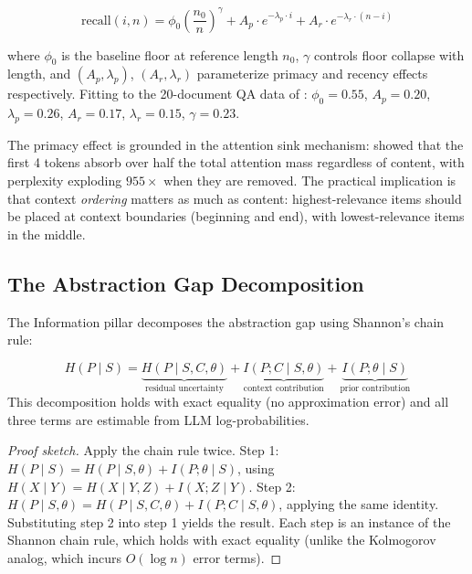 \begin{equation}
    \text{recall}(i, n) = \phi_0 \left(\frac{n_0}{n}\right)^{\!\gamma} + A_p \cdot e^{-\lambda_p \cdot i} + A_r \cdot e^{-\lambda_r \cdot (n - i)}
\end{equation}

where $\phi_0$ is the baseline floor at reference length $n_0$, $\gamma$ controls floor collapse with length, and $(A_p, \lambda_p)$, $(A_r, \lambda_r)$ parameterize primacy and recency effects respectively. Fitting to the 20-document QA data of \citet{liu2024lost}: $\phi_0 = 0.55$, $A_p = 0.20$, $\lambda_p = 0.26$, $A_r = 0.17$, $\lambda_r = 0.15$, $\gamma = 0.23$.

The primacy effect is grounded in the attention sink mechanism: \citet{xiao2024efficient} showed that the first 4 tokens absorb over half the total attention mass regardless of content, with perplexity exploding $955\times$ when they are removed. The practical implication is that context \emph{ordering} matters as much as content: highest-relevance items should be placed at context boundaries (beginning and end), with lowest-relevance items in the middle.

\subsection{The Abstraction Gap Decomposition}

The Information pillar decomposes the abstraction gap using Shannon's chain rule:

\begin{theorem}
\label{thm:gap-decomposition}
\begin{equation}
    H(P \mid S) = \underbrace{H(P \mid S, C, \theta)}_{\text{residual uncertainty}} + \underbrace{I(P; C \mid S, \theta)}_{\text{context contribution}} + \underbrace{I(P; \theta \mid S)}_{\text{prior contribution}}
\end{equation}
This decomposition holds with exact equality (no approximation error) and all three terms are estimable from LLM log-probabilities.
\end{theorem}

\begin{proof}[Proof sketch]
Apply the chain rule twice. Step 1: $H(P \mid S) = H(P \mid S, \theta) + I(P; \theta \mid S)$, using $H(X \mid Y) = H(X \mid Y, Z) + I(X; Z \mid Y)$. Step 2: $H(P \mid S, \theta) = H(P \mid S, C, \theta) + I(P; C \mid S, \theta)$, applying the same identity. Substituting step 2 into step 1 yields the result. Each step is an instance of the Shannon chain rule, which holds with exact equality (unlike the Kolmogorov analog, which incurs $O(\log n)$ error terms).
\end{proof}

